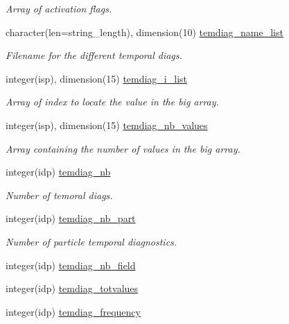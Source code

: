 \begin{DoxyCompactItemize}
\begin{DoxyCompactList}\small\item\em Array of activation flags. \end{DoxyCompactList}\item 
character(len=string\+\_\+length), dimension(10) \hyperlink{namespaceoutput__data_a891f4f8be197dbbfe91c01ee5260b4c2}{temdiag\+\_\+name\+\_\+list}
\begin{DoxyCompactList}\small\item\em Filename for the different temporal diags. \end{DoxyCompactList}\item 
integer(isp), dimension(15) \hyperlink{namespaceoutput__data_a9cf412af092dd4e6d2877134a66b665d}{temdiag\+\_\+i\+\_\+list}
\begin{DoxyCompactList}\small\item\em Array of index to locate the value in the big array. \end{DoxyCompactList}\item 
integer(isp), dimension(15) \hyperlink{namespaceoutput__data_aa73fc47cc7d7d0cee7422d6fee957c48}{temdiag\+\_\+nb\+\_\+values}
\begin{DoxyCompactList}\small\item\em Array containing the number of values in the big array. \end{DoxyCompactList}\item 
integer(idp) \hyperlink{namespaceoutput__data_a996655a7d030216dcce6367a59b22ae8}{temdiag\+\_\+nb}
\begin{DoxyCompactList}\small\item\em Number of temoral diags. \end{DoxyCompactList}\item 
integer(idp) \hyperlink{namespaceoutput__data_a950d70a052698f77988f39da1fddf632}{temdiag\+\_\+nb\+\_\+part}
\begin{DoxyCompactList}\small\item\em Number of particle temporal diagnostics. \end{DoxyCompactList}\item 
integer(idp) \hyperlink{namespaceoutput__data_a6e3150da1e4314b418b4f40c56737551}{temdiag\+\_\+nb\+\_\+field}
\item 
integer(idp) \hyperlink{namespaceoutput__data_a85fe1c4047057dc4292320e82cae2cda}{temdiag\+\_\+totvalues}
\item 
integer(idp) \hyperlink{namespaceoutput__data_ab55f479db67f7b4af32d0a55e2ba6620}{temdiag\+\_\+frequency}

\end{DoxyCompactItemize}
